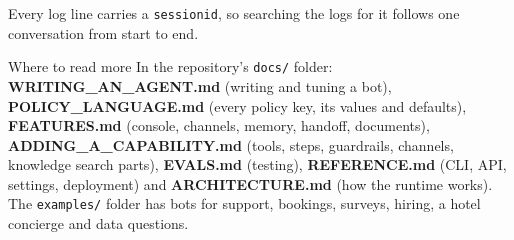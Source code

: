 \documentclass[11pt,a4paper]{article}
\newcommand{\codeus}{\textunderscore\allowbreak}
\newcommand{\code}[1]{{\renewcommand{\_}{\codeus}\texttt{\upshape #1}}}
\begin{document}
Every log line carries a \code{session\_id}, so searching the logs for it follows one conversation from start to
end.

\begin{panel}{Where to read more}
\small
In the repository's \code{docs/} folder: \textbf{WRITING\_AN\_AGENT.md} (writing and tuning a bot),
\textbf{POLICY\_LANGUAGE.md} (every policy key, its values and defaults), \textbf{FEATURES.md} (console, channels,
memory, handoff, documents), \textbf{ADDING\_A\_CAPABILITY.md} (tools, steps, guardrails, channels, knowledge
search parts), \textbf{EVALS.md} (testing), \textbf{REFERENCE.md} (CLI, API, settings, deployment) and
\textbf{ARCHITECTURE.md} (how the runtime works). The \code{examples/} folder has bots for support, bookings,
surveys, hiring, a hotel concierge and data questions.
\end{panel}
\end{document}
